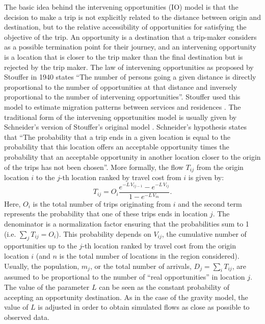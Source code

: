 The basic idea behind the intervening opportunities (IO) model is that the decision to make a trip is not explicitly related to the distance between origin and destination, but to the relative accessibility of opportunities for satisfying the objective of the trip. An opportunity is a destination that a trip-maker considers as a possible termination point for their journey, and an intervening opportunity is a location that is closer to the trip maker than the final destination but is rejected by the trip maker. The law of intervening opportunities as proposed by Stouffer in 1940 states ``The number of persons going a given distance is directly proportional to the number of opportunities at that distance and inversely proportional to the number of intervening opportunities''.
Stouffer used this model to estimate migration patterns between services and residences \cite{stouffer_1940_intervening}. 
The traditional form of the intervening opportunities model is usually given by Schneider's version of Stouffer's original model \cite{schneider_1959_gravity}. 
Schneider's hypothesis states that ``The probability that a trip ends in a given location is equal to the probability that this location offers an acceptable opportunity times the probability that an acceptable opportunity in another location closer to the origin of the trips has not been chosen''. 
More formally, 
the flow $T_{ij}$ from the origin location $i$ to the $j$-th location ranked by travel cost from $i$ is given by:
\begin{equation}
  T_{ij}=O_i \frac{e^{-L \, V_{ij-1}}-e^{-L\, V_{ij}}}{1-e^{-L \,V_{in}}} .
  \label{IO}
\end{equation}
Here, $O_i$ is the total number of trips originating from $i$ and the second term represents the probability that one of these trips ends in location $j$. The denominator is a normalization factor ensuring that the probabilities sum to 1 (i.e. $\sum_j T_{ij}=O_i$). This probability depends on $V_{ij}$, the cumulative number of opportunities up to the $j$-th location ranked by travel cost from the origin location $i$ (and $n$ is the total number of locations in the region considered). 
Usually, the population, $m_j$, or the total number of arrivals, $D_j=\sum_i T_{ij}$, are assumed to be proportional to the number of ``real opportunities'' in location $j$. 
The value of the parameter $L$ can be seen as the constant probability of accepting an opportunity destination. As in the case of the gravity model, the value of $L$ is adjusted in order to obtain simulated flows as close as possible to observed data. 

